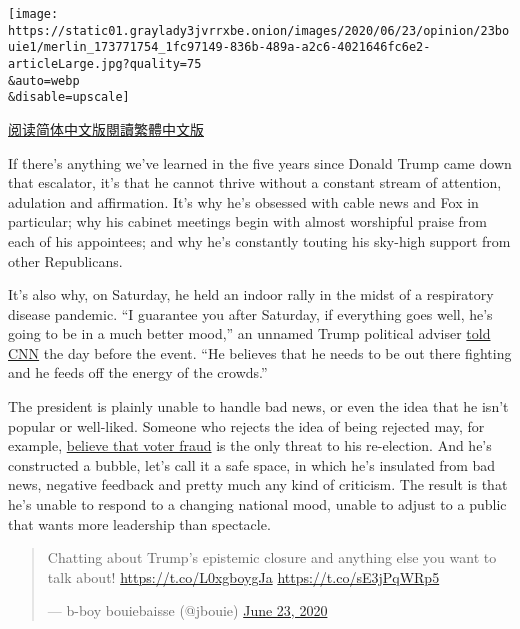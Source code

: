 \texttt{[image: https://static01.graylady3jvrrxbe.onion/images/2020/06/23/opinion/23bouie1/merlin\_173771754\_1fc97149-836b-489a-a2c6-4021646fc6e2-articleLarge.jpg?quality=75\\\&auto=webp\\\&disable=upscale]}

\href{https://cn.nytimes3xbfgragh.onion/opinion/20200624/maga-trump-fake-news/}{阅读简体中文版}\href{https://cn.nytimes3xbfgragh.onion/opinion/20200624/maga-trump-fake-news/zh-hant/}{閱讀繁體中文版}

If there's anything we've learned in the five years since Donald Trump
came down that escalator, it's that he cannot thrive without a constant
stream of attention, adulation and affirmation. It's why he's obsessed
with cable news and Fox in particular; why his cabinet meetings begin
with almost worshipful praise from each of his appointees; and why he's
constantly touting his sky-high support from other Republicans.

It's also why, on Saturday, he held an indoor rally in the midst of a
respiratory disease pandemic. ``I guarantee you after Saturday, if
everything goes well, he's going to be in a much better mood,'' an
unnamed Trump political adviser
\href{https://www.cnn.com/2020/06/19/politics/trump-turn-around-losing-campaign/index.html}{told
CNN} the day before the event. ``He believes that he needs to be out
there fighting and he feeds off the energy of the crowds.''

The president is plainly unable to handle bad news, or even the idea
that he isn't popular or well-liked. Someone who rejects the idea of
being rejected may, for example,
\href{https://twitter.com/realdonaldtrump/status/1275024974579982336?s=21}{believe
that voter fraud} is the only threat to his re-election. And he's
constructed a bubble, let's call it a safe space, in which he's
insulated from bad news, negative feedback and pretty much any kind of
criticism. The result is that he's unable to respond to a changing
national mood, unable to adjust to a public that wants more leadership
than spectacle.

\begin{quote}
Chatting about Trump's epistemic closure and anything else you want to
talk about! \url{https://t.co/L0xgboygJa} \url{https://t.co/sE3jPqWRp5}

--- b-boy bouiebaisse (@jbouie)
\href{https://twitter.com/jbouie/status/1275477105204051969?ref_src=twsrc\%5Etfw}{June
23, 2020}
\end{quote}

